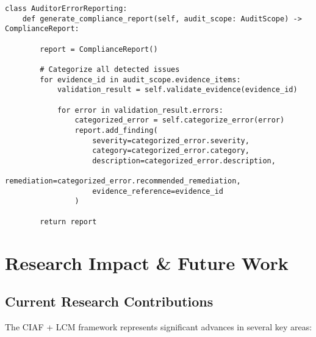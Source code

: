 \documentclass[12pt,a4paper]{article}
\begin{document}
\begin{lstlisting}[caption=Error Taxonomy Implementation]
class AuditorErrorReporting:
    def generate_compliance_report(self, audit_scope: AuditScope) -> ComplianceReport:

        report = ComplianceReport()
        
        # Categorize all detected issues
        for evidence_id in audit_scope.evidence_items:
            validation_result = self.validate_evidence(evidence_id)
            
            for error in validation_result.errors:
                categorized_error = self.categorize_error(error)
                report.add_finding(
                    severity=categorized_error.severity,
                    category=categorized_error.category,
                    description=categorized_error.description,
                    remediation=categorized_error.recommended_remediation,
                    evidence_reference=evidence_id
                )
        
        return report
\end{lstlisting}

\section{Research Impact \& Future Work}

\subsection{Current Research Contributions}

The CIAF + LCM framework represents significant advances in several key areas:
\end{document}
